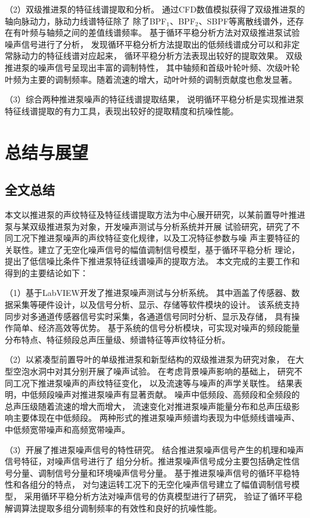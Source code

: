 （2）双级推进泵的特征线谱提取和分析。
通过CFD数值模拟获得了双级推进泵的轴向脉动力，脉动力线谱特征除了
除了BPF$_1$、BPF$_2$、SBPF等离散线谱外，还存在有叶频与轴频之间的差值线谱频率。
基于循环平稳分析方法对双级推进泵试验噪声信号进行了分析，
发现循环平稳分析方法提取出的低频线谱成分可以和非定常脉动力的特征线谱对应起来，
循环平稳分析方法表现出较好的提取效果。
双级推进泵的噪声信号呈现出丰富的调制特性，
其中轴频和首级叶轮叶频、次级叶轮叶频为主要的调制频率。随着流速的增大，动叶叶频的调制贡献度也愈发显著。

（3）综合两种推进泵噪声的特征线谱提取结果，
说明循环平稳分析是实现推进泵特征线谱提取的有力工具，表现出较好的提取精度和抗噪性能。


\chapter{总结与展望}
\section{全文总结}
本文以推进泵的声纹特征及特征线谱提取方法为中心展开研究，以某前置导叶推进
泵与某双级推进泵为对象，开发噪声测试与分析系统并开展
试验研究，研究了不同工况下推进泵噪声的声纹特征变化规律，以及工况特征参数与噪
声主要特征的关联性。建立了无空化噪声信号的幅值调制信号模型，基于循环平稳分析
理论，提出了低信噪比条件下推进泵特征线谱噪声的提取方法。
本文完成的主要工作和得到的主要结论如下：

（1）基于LabVIEW开发了推进泵噪声测试与分析系统。
其中涵盖了传感器、数据采集等硬件设计，以及信号分析、显示、存储等软件模块的设计。
该系统支持同步对多通道传感器信号实时采集，各通道信号同时分析、显示及存储，
具有操作简单、经济高效等优势。
基于系统的信号分析模块，可实现对噪声的频段能量分布特点、特征频段总声压量级、频谱特征等声纹特征分析。

（2）以紧凑型前置导叶的单级推进泵和新型结构的双级推进泵为研究对象，
在大型空泡水洞中对其分别开展了噪声试验。
在考虑背景噪声影响的基础上，
研究不同工况下推进泵噪声的声纹特征变化，
以及流速等与噪声的声学关联性。
结果表明，中低频段噪声对推进泵噪声有显著贡献。
噪声中低频段、高频段和全频段的总声压级随着流速的增大而增大，
流速变化对推进泵噪声能量分布和总声压级影响主要体现在中低频段。
两种形式的推进泵噪声频谱均表现为中低频线谱噪声、中低频宽带噪声和高频宽带噪声。

（3）开展了推进泵噪声信号的特性研究。
结合推进泵噪声信号产生的机理和噪声信号特征，对噪声信号进行了
组分分析。推进泵噪声信号成分主要包括确定性信号分量、调制信号分量和环境噪声信号分量。
基于推进泵噪声信号的循环平稳特性和各组分的特点，
对匀速运转工况下的无空化噪声信号建立了幅值调制信号模型，
采用循环平稳分析方法对噪声信号的仿真模型进行了研究，
验证了循环平稳解调算法提取多组分调制频率的有效性和良好的抗噪性能。
 
